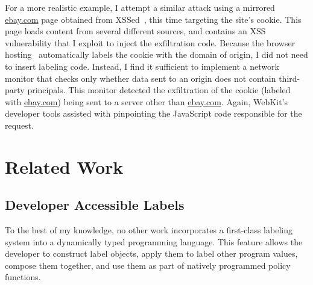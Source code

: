 For a more realistic example, I attempt a similar attack using a mirrored \url{ebay.com} page obtained from XSSed~\cite{xssed}, this time targeting the site's cookie.
This page loads content from several different sources, and contains an XSS vulnerability that I exploit to inject the exfiltration code.
Because the browser hosting \FlowCore\ automatically labels the cookie with the domain of origin, I did not need to insert labeling code.
Instead, I find it sufficient to implement a network monitor that checks only whether data sent to an origin does not contain third-party principals.
This monitor detected the exfiltration of the cookie (labeled with \url{ebay.com}) being sent to a server other than \url{ebay.com}.
Again, WebKit's developer tools assisted with pinpointing the JavaScript code responsible for the request.


\section{Related Work}

\subsection{Developer Accessible Labels}

To the best of my knowledge, no other work incorporates a first-class labeling system into a dynamically typed programming language.
This feature allows the developer to construct label objects, apply them to label other program values, compose them together, and use them as part of natively programmed policy functions.


